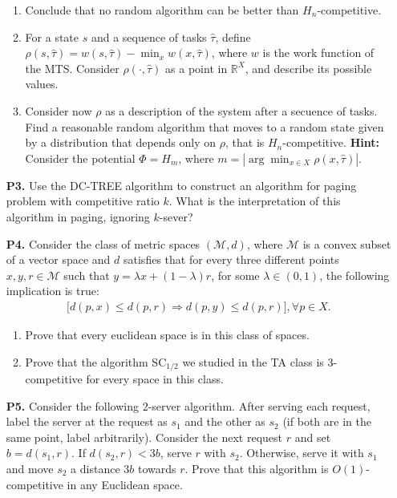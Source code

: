 \documentclass[11pt, spanish]{article}
\theoremstyle{plain}
\newcommand{\R}{\mathds{R}}
\begin{document}
\begin{itemize}
\begin{enumerate}
      \item Conclude that no random algorithm can be better than $H_n$-competitive.
      \item For a state $s$ and a sequence of tasks $\hat{\tau}$, define
	$\rho(s,\hat{\tau})= w(s,\hat{\tau}) - \min_x w(x,\hat{\tau})$, where
	$w$ is the work function of the MTS. Consider $\rho(\cdot,\hat{\tau})$ as
	a point in $\R^X$, and describe its possible values.
      \item Consider now $\rho$ as a description of the system after a secuence
	of tasks. Find a reasonable random algorithm that moves to a random
	state given by a distribution that depends only on $\rho$, that is
	$H_n$-competitive. \textbf{Hint:} Consider the potential $\Phi=H_m$, where
	$m= | \arg\min_{x\in X} \rho(x,\hat{\tau}) |$.
    \end{enumerate}

  \item[\textbf{P3.}] Use the DC-TREE algorithm to construct an algorithm for paging problem with competitive ratio $k$. What is the interpretation of this algorithm in paging, ignoring $k$-sever?

  \item[\textbf{P4.}] Consider the class of metric spaces $(\mathcal{M},d)$, where $\mathcal{M}$
  is a convex subset of a vector space and $d$ satisfies that for every three different points
  $x,y,r\in \mathcal{M}$ such that $y= \lambda x + (1-\lambda)r$, for some $\lambda\in (0,1)$,
  the following implication is true:
  \begin{align*}
    \big[ d(p,x) \leq d(p,r) \Rightarrow d(p,y) \leq d(p,r)  \big], \forall p\in X.
  \end{align*}
  \begin{enumerate}
    \item Prove that every euclidean space is in this class of
  	spaces.
      \item Prove that the algorithm SC$_{1/2}$ we studied in the TA class is 3-competitive
	for every space in this class.
    \end{enumerate}

  \item[\textbf{P5.}] Consider the following 2-server algorithm. After serving each request,
    label the server at the request as $s_1$ and the other as $s_2$ (if both are in the same
    point, label arbitrarily). Consider the next request $r$ and set $b= d(s_1,r)$. If
    $d(s_2,r)< 3b$, serve $r$ with $s_2$. Otherwise, serve it with $s_1$ and move $s_2$
    a distance $3b$ towards $r$. Prove that this algorithm is $O(1)$-competitive in any
    Euclidean space.

\end{itemize}
\end{document}
